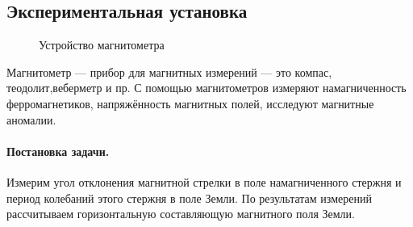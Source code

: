 \documentclass[a4paper, 12pt]{article}
\begin{document}
	\subsection*{Экспериментальная установка}
	\begin{figure}[h]
		\begin{minipage}[h]{0.5\linewidth}
		\end{minipage}
		\begin{minipage}[h]{0.5\linewidth}
		\end{minipage}
		\caption{Устройство магнитометра}
		\label{ris:station}
	\end{figure}
	Магнитометр — прибор для магнитных измерений — это компас, теодолит,веберметр и пр. С помощью магнитометров измеряют намагниченность ферромагнетиков, напряжённость магнитных полей, исследуют магнитные аномалии.\\
	\paragraph{Постановка задачи.} Измерим угол отклонения магнитной стрелки в поле намагниченного стержня и период колебаний этого стержня в поле Земли. По результатам измерений рассчитываем горизонтальную составляющую магнитного поля Земли.
\end{document}
